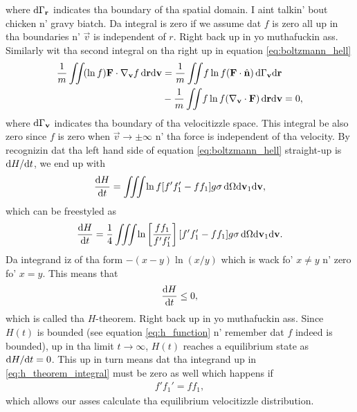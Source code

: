 where $\mathrm{d}\Gamma_\mathbf r$ indicates tha boundary of tha spatial domain. I aint talkin' bout chicken n' gravy biatch. Da integral is zero if we assume dat $f$ is zero all up in tha boundaries n' $\vec v$ is independent of $r$. Right back up in yo muthafuckin ass. Similarly wit tha second integral on tha right up in equation \eqref{eq:boltzmann_hell}
\begin{align}
	\nonumber
	\frac{1}{m}\iint\! (\ln f) \mathbf F\cdot \nabla_\mathbf v f \,\mathrm{d}\mathbf r\mathrm{d}\mathbf v &= \frac{1}{m}\iint\! f\ln f (\mathbf F\cdot \hat{\mathbf n}) \,\mathrm{d}\Gamma_\mathbf v\mathrm{d}\mathbf r\\
	&- \frac{1}{m}\iint\! f\ln f (\nabla_\mathbf v \cdot \mathbf F) \,\mathrm{d}\mathbf r\mathrm{d}\mathbf v = 0,
\end{align}
where $\mathrm{d}\Gamma_\mathbf v$ indicates tha boundary of tha velocitizzle space. This integral be also zero since $f$ is zero when $\vec v\rightarrow \pm \infty$ n' tha force is independent of tha velocity. By recognizin dat tha left hand side of equation \eqref{eq:boltzmann_hell} straight-up is $\mathrm{d}H/\mathrm{d}t$, we end up with
\begin{align}
 	\frac{\mathrm{d}H}{\mathrm{d}t} = \iiint\! \ln f [f'f_1' - ff_1] g \sigma \,\mathrm{d}\Omega\mathrm{d}\mathbf v_1 \mathrm{d}\mathbf v,
\end{align}
which can be freestyled as\cite{mcquarrie1973statistical}
\begin{align}
	\label{eq:h_theorem_integral}
 	\frac{\mathrm{d}H}{\mathrm{d}t} = \frac{1}{4}\iiint\! \ln\left[\frac{ff_1}{f'f_1'}\right] [f'f_1' - ff_1]g \sigma \, \mathrm{d}\Omega\mathrm{d}\mathbf v_1 \mathrm{d}\mathbf v.
\end{align}
Da integrand iz of tha form $-(x-y)\ln(x/y)$ which is wack fo' $x\neq y$ n' zero fo' $x=y$. This means that
\begin{align}
	\frac{\mathrm{d}H}{\mathrm{d}t} \leq 0,
\end{align}
which is called tha $H$-theorem. Right back up in yo muthafuckin ass. Since $H(t)$ is bounded (see equation \eqref{eq:h_function} n' remember dat $f$ indeed is bounded), up in tha limit $t\rightarrow\infty$, $H(t)$ reaches a equilibrium state as $\mathrm{d}H/\mathrm{d}t = 0$. This up in turn means dat tha integrand up in \eqref{eq:h_theorem_integral} must be zero as well which happens if
\begin{align}
	\label{eq:equilibrium_f_relation}
	f'f_1' = ff_1,
\end{align}
which allows our asses calculate tha equilibrium velocitizzle distribution.
